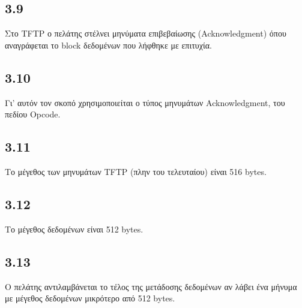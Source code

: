 		\subsection*{3.9}
			Στο TFTP ο πελάτης στέλνει μηνύματα επιβεβαίωσης (Acknowledgment) όπου αναγράφεται το block δεδομένων που λήφθηκε με επιτυχία.

		\subsection*{3.10}
			Γι' αυτόν τον σκοπό χρησιμοποιείται ο τύπος μηνυμάτων Acknowledgment, του πεδίου Opcode.

		\subsection*{3.11}
			Το μέγεθος των μηνυμάτων TFTP (πλην του τελευταίου) είναι 516 bytes.

		\subsection*{3.12}
			Το μέγεθος δεδομένων είναι 512 bytes.

		\subsection*{3.13}
			Ο πελάτης αντιλαμβάνεται το τέλος της μετάδοσης δεδομένων αν λάβει ένα μήνυμα με μέγεθος δεδομένων μικρότερο από 512 bytes.
